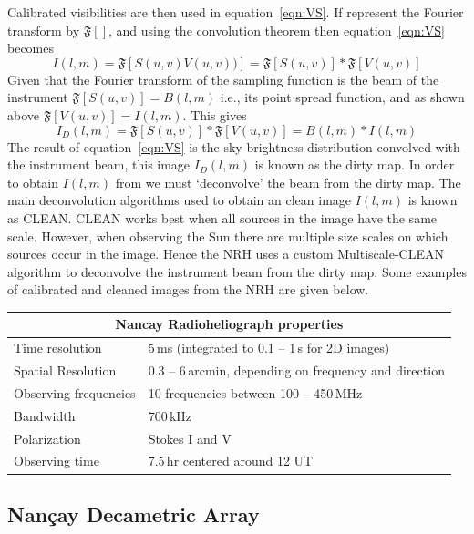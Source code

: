 Calibrated visibilities are then used in equation~\ref{eqn:VS}. If represent the Fourier transform by $\mathfrak{F}[]$, and using the convolution theorem then equation~\ref{eqn:VS} becomes
\begin{equation}
I(l,m)=\mathfrak{F}[S(u,v)V(u,v))] = \mathfrak{F}[S(u,v)]\ast\mathfrak{F}[V(u,v)]
\label{eqn:VS2}
\end{equation}
Given that the Fourier transform of the sampling function is the beam of the instrument $\mathfrak{F}[S(u,v)] = B(l,m)$ i.e., its point spread function, and as shown above $\mathfrak{F}[V(u,v)] = I(l,m)$. This gives
\begin{equation}
I_D(l,m) = \mathfrak{F}[S(u,v)]\ast\mathfrak{F}[V(u,v)] = B(l,m) \ast I(l,m)
\label{eqn:convol}
\end{equation}
The result of equation~\ref{eqn:VS} is the sky brightness distribution convolved with the instrument beam, this image $I_D(l,m)$ is known as the dirty map. In order to obtain $I(l,m)$ from we must `deconvolve' the beam from the dirty map. The main deconvolution algorithms used to obtain an clean image $I(l,m)$ is known as CLEAN. CLEAN works best when all sources in the image have the same scale. However, when observing the Sun there are multiple size scales on which sources occur in the image. Hence the NRH uses a custom Multiscale-CLEAN algorithm to deconvolve the instrument beam from the dirty map. Some examples of calibrated and cleaned images from the NRH are given below.

\begin{tabular}{ |l|l| }
  \hline
  \multicolumn{2}{|c|}{Nancay Radioheliograph properties} \\
  \hline
  Time resolution & 5\,ms (integrated to 0.1 -- 1\,s for 2D images) \\
  Spatial Resolution & 0.3 -- 6\,arcmin, depending on frequency and direction \\
  Observing frequencies & 10 frequencies between 100 -- 450\,MHz \\
  Bandwidth & 700\,kHz \\
  Polarization & Stokes I and V \\
  Observing time & 7.5\,hr centered around 12 UT \\
  \hline
\end{tabular}

\subsection{Nan\c{c}ay Decametric Array}\label{sec:32}

